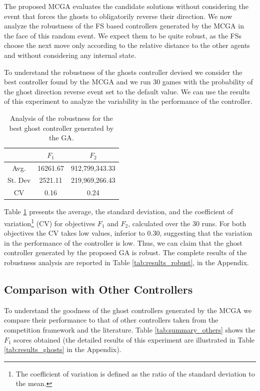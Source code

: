 \documentclass[journal]{IEEEtran}
\begin{document}
The proposed MCGA evaluates the candidate solutions without considering the event that forces the ghosts to obligatorily reverse their direction. We now analyze the robustness of the FS based controllers generated by the MCGA in the face of this random event. We expect them to be quite robust, as the FSs choose the next move only according to the relative distance to the other agents and without considering any internal state.

To understand the robustness of the ghosts controller devised we consider the best controller found by the MCGA and we run 30 games with the probability of the ghost direction reverse event set to the default value. We can use the results of this experiment to analyze the variability in the performance of the controller.

\begin{table}[!t]
\caption{Analysis of the robustness for the best ghost controller generated by the GA.}
\label{tab:summary_robust}
\centering
\begin{tabular}{|c|c|c|}
\hline
 & $F_1$ & $F_2$ \\
\hline
Avg.	&	16261.67	&	912,799,343.33	\\
\hline
St. Dev	&	2521.11	&	219,969,266.43	\\
\hline
CV	&	0.16	&	0.24	\\
\hline
\end{tabular}
\end{table}

Table \ref{tab:summary_robust} presents the average, the standard deviation, and the coefficient of variation\footnote{The coefficient of variation is defined as the ratio of the standard deviation to the mean.} (CV) for objectives $F_1$ and $F_2$, calculated over the 30 runs. For both objectives the CV takes low values, inferior to 0.30, suggesting that the variation in the performance of the controller is low. Thus, we can claim that the ghost controller generated by the proposed GA is robust. The complete results of the robustness analysis are reported in Table \ref{tab:results_robust}, in the Appendix.

\subsection{Comparison with Other Controllers}
To understand the goodness of the ghost controllers generated by the MCGA we compare their performance to that of other controllers taken from the competition framework and the literature. Table \ref{tab:summary_others} shows the $F_1$ scores obtained (the detailed results of this experiment are illustrated in Table \ref{tab:results_ghosts} in the Appendix).
\end{document}

